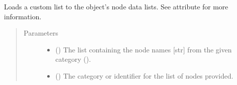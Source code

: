 \documentclass[letterpaper,10pt,english]{sphinxmanual}
\begin{document}
\begin{fulllineitems}
\begin{fulllineitems}
\label{\detokenize{main:pypath.main.PyPath.load_list}}
Loads a custom list to the object’s node data lists. See
 attribute for more
information.
\begin{quote}\begin{description}
\item[{Parameters}] \leavevmode\begin{itemize}
\item {} 
 () \textendash{} The list containing the node names {[}str{]} from the given
category ().

\item {} 
 () \textendash{} The category or identifier for the list of nodes provided.

\end{itemize}

\end{description}\end{quote}

\end{fulllineitems}


\begin{fulllineitems}
\label{\detokenize{main:pypath.main.PyPath.load_lmpid}}
\end{fulllineitems}


\begin{fulllineitems}
\label{\detokenize{main:pypath.main.PyPath.load_mappings}}
\end{fulllineitems}


\begin{fulllineitems}
\label{\detokenize{main:pypath.main.PyPath.load_mimp_dmi}}
\end{fulllineitems}


\end{fulllineitems}
\end{document}
